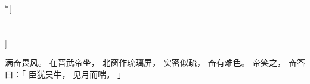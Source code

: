
\switchcolumn[0]*[\section{}]

满奋畏风。
在晋武帝坐，
北窗作琉璃屏，
实密似疏，
奋有难色。
帝笑之，
奋答曰：「
    臣犹吴牛，
    见月而喘。
」

\switchcolumn



